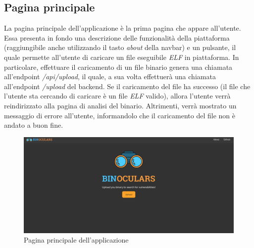 \documentclass[../main.tex]{subfiles}
\begin{document}
\subsection{Pagina principale}
La pagina principale dell'applicazione è la prima pagina che appare all'utente. Essa presenta in fondo una descrizione delle funzionalità della piattaforma (raggiungibile anche utilizzando il tasto \textit{about} della navbar)
e un pulsante, il quale permette all'utente di caricare un file eseguibile \textit{ELF} in piattaforma. In particolare, effettuare il caricamento di un file binario genera una chiamata all'endpoint \textit{/api/upload}, il quale, a sua volta
effettuerà una chiamata all'endpoint \textit{/upload} del backend. Se il caricamento del file ha successo (il file che l'utente sta cercando di caricare è un file \textit{ELF} valido), allora l'utente verrà reindirizzato alla pagina
di analisi del binario. Altrimenti, verrà mostrato un messaggio di errore all'utente, informandolo che il caricamento del file non è andato a buon fine.
\begin{figure}[H]
    \centering
    \includegraphics[width = \textwidth]{../images/main page.png}
    \caption{Pagina principale dell'applicazione}
\end{figure}

\end{document}
